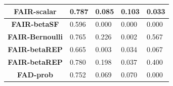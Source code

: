 \documentclass[preprint,12pt]{elsarticle}
\begin{document}
\begin{table}
\begin{tabular}{|c|l|l|l|l|}
		\textbf{FAIR-scalar}    & 0.787                             & 0.085                             & 0.103                             & 0.033                              \\ \hline
		\textbf{FAIR-betaSF}    & 0.596                             & 0.000                             & 0.000                             & 0.000                              \\ \hline
		\textbf{FAIR-Bernoulli} & 0.765                             & 0.226                             & 0.002                             & 0.567                              \\ \hline
		\textbf{FAIR-betaREP}   & 0.665                             & 0.003                             & 0.034                             & 0.067                              \\ \hline
		\textbf{FAIR-betaREP}   & 0.780                             & 0.198                             & 0.037                             & 0.400                              \\ \hline
		\textbf{FAD-prob}       & 0.752                             & 0.069                             & 0.070                             & 0.000                              \\ \hline
	\end{tabular}
	\label{tab:Ger-age}
\end{table}
\end{document}
